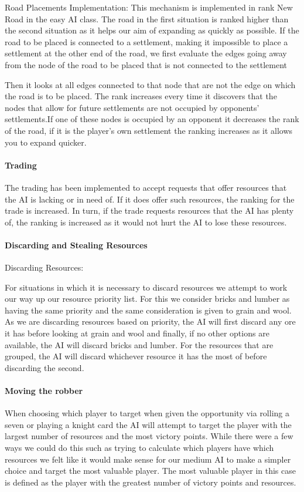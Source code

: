 \documentclass[a4paper,doc]{apa6}
\begin{document}
Road Placements Implementation:
	This mechanism is implemented in rank New Road in the easy AI class. The road in the first situation is ranked higher than the second situation as it helps our aim of expanding as quickly as possible. If the road to be placed is connected to a settlement, making it impossible to place a settlement at the other end of the road, we first evaluate the edges going away from the node of the road to be placed that is not connected to the settlement

Then it looks at all edges connected to that node that are not the edge on which the road is to be placed. The rank increases every time it discovers that the nodes that allow for future settlements are not occupied by opponents’ settlements.If one of these nodes is occupied by an opponent it decreases the rank of the road, if it is the player’s own settlement the ranking increases as it allows you to expand quicker.

\paragraph{Trading}
The trading has been implemented to accept requests that offer resources that the AI is lacking or in need of. If it does offer such resources, the ranking for the trade is increased. In turn, if the trade requests resources that the AI has plenty of, the ranking is increased as it would not hurt the AI to lose these resources.


\paragraph{Discarding and Stealing Resources}
Discarding Resources:

For situations in which it is necessary to discard resources we attempt to work our way up our resource priority list. For this we consider bricks and lumber as having the same priority and the same consideration is given to grain and wool. As we are discarding resources based on priority, the AI will first discard any ore it has before looking at grain and wool and finally, if no other options are available, the AI will discard bricks and lumber. For the resources that are grouped, the AI will discard whichever resource it has the most of before discarding the second.

\paragraph{Moving the robber}
When choosing which player to target when given the opportunity via rolling a seven or playing a knight card the AI will attempt to target the player with the largest number of resources and the most victory points. While there were a few ways we could do this such as trying to calculate which players have which resources we felt like it would make sense for our medium AI to make a simpler choice and target the most valuable player. The most valuable player in this case is defined as the player with the greatest number of victory points and resources.
\end{document}
